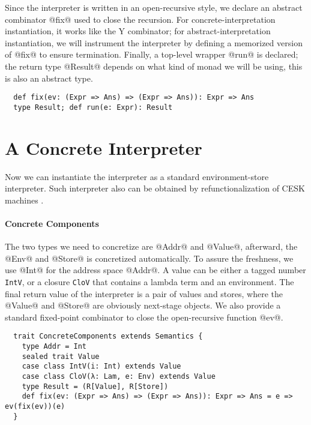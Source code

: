Since the interpreter is written in an open-recursive style, we declare an abstract
combinator @fix@ used to close the recursion. For concrete-interpretation instantiation, it
works like the Y combinator; for abstract-interpretation instantiation, we will
instrument the interpreter by defining a memorized version of @fix@ to ensure
termination. Finally, a top-level wrapper @run@ is declared; the return type
@Result@ depends on what kind of monad we will be using, this is also an abstract type.

\begin{lstlisting}
  def fix(ev: (Expr => Ans) => (Expr => Ans)): Expr => Ans
  type Result; def run(e: Expr): Result
\end{lstlisting}


\section{A Concrete Interpreter} \label{unstaged_conc}

Now we can instantiate the interpreter as a standard environment-store
interpreter. Such interpreter also can be obtained by refunctionalization of
CESK machines \cite{Felleisen:1987:CAH:41625.41654, DBLP:conf/ppdp/AgerBDM03}.

\paragraph{Concrete Components}
The two types we need to concretize are @Addr@ and @Value@, afterward, the @Env@
and @Store@ is concretized automatically. To assure the freshness, we use @Int@
for the address space @Addr@. A value can be either a tagged number
\texttt{IntV}, or a closure \texttt{CloV} that contains a lambda term and an
environment. The final return value of the interpreter is a pair of values and
stores, where the @Value@ and @Store@ are obviously next-stage objects. We also
provide a standard fixed-point combinator to close the open-recursive function @ev@.

\begin{lstlisting}
  trait ConcreteComponents extends Semantics {
    type Addr = Int
    sealed trait Value
    case class IntV(i: Int) extends Value
    case class CloV(λ: Lam, e: Env) extends Value
    type Result = (R[Value], R[Store])
    def fix(ev: (Expr => Ans) => (Expr => Ans)): Expr => Ans = e => ev(fix(ev))(e)
  }
\end{lstlisting}

